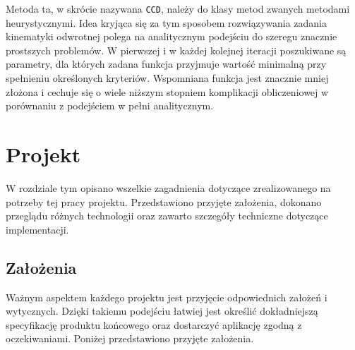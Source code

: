 \documentclass[11pt]{mwrep}
\begin{document}
  Metoda ta, w skrócie nazywana \texttt{CCD}, należy do klasy metod zwanych metodami heurystycznymi. Idea kryjąca się za tym sposobem rozwiązywania zadania kinematyki odwrotnej polega na analitycznym podejściu do szeregu znacznie prostszych problemów. W pierwszej i w każdej kolejnej iteracji poszukiwane są parametry, dla których zadana funkcja przyjmuje wartość minimalną przy spełnieniu określonych kryteriów. Wspomniana funkcja jest znacznie mniej złożona i cechuje się o wiele niższym stopniem komplikacji obliczeniowej w porównaniu z podejściem w pełni analitycznym.



\chapter{Projekt}

W rozdziale tym opisano wszelkie zagadnienia dotyczące zrealizowanego na potrzeby tej pracy projektu. Przedstawiono przyjęte założenia, dokonano przeglądu różnych technologii oraz zawarto szczegóły techniczne dotyczące implementacji.


  \section{Założenia}

Ważnym aspektem każdego projektu jest przyjęcie odpowiednich założeń i wytycznych. Dzięki takiemu podejściu łatwiej jest określić dokładniejszą specyfikację produktu końcowego oraz dostarczyć aplikację zgodną z oczekiwaniami. Poniżej przedstawiono przyjęte założenia.
\end{document}
